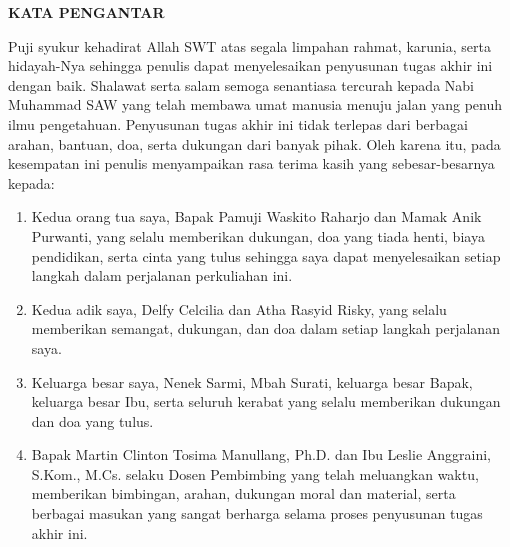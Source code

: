 \clearpage
{}%

\begin{justifying}
	\large \bfseries \centering \MakeUppercase{Kata Pengantar}\linebreak
	
	\normalsize \normalfont \justifying
	Puji syukur kehadirat Allah SWT atas segala limpahan rahmat, karunia, serta hidayah-Nya sehingga penulis dapat menyelesaikan penyusunan tugas akhir ini dengan baik. Shalawat serta salam semoga senantiasa tercurah kepada Nabi Muhammad SAW yang telah membawa umat manusia menuju jalan yang penuh ilmu pengetahuan. Penyusunan tugas akhir ini tidak terlepas dari berbagai arahan, bantuan, doa, serta dukungan dari banyak pihak. Oleh karena itu, pada kesempatan ini penulis menyampaikan rasa terima kasih yang sebesar-besarnya kepada: \par
	\begin{enumerate}
		\item Kedua orang tua saya, Bapak Pamuji Waskito Raharjo dan Mamak Anik Purwanti, yang selalu memberikan dukungan, doa yang tiada henti, biaya pendidikan, serta cinta yang tulus sehingga saya dapat menyelesaikan setiap langkah dalam perjalanan perkuliahan ini.
		\item Kedua adik saya, Delfy Celcilia dan Atha Rasyid Risky, yang selalu memberikan semangat, dukungan, dan doa dalam setiap langkah perjalanan saya.
		\item Keluarga besar saya, Nenek Sarmi, Mbah Surati, keluarga besar Bapak, keluarga besar Ibu, serta seluruh kerabat yang selalu memberikan dukungan dan doa yang tulus.
		\item Bapak Martin Clinton Tosima Manullang, Ph.D. dan Ibu Leslie Anggraini, S.Kom., M.Cs. selaku Dosen Pembimbing yang telah meluangkan waktu, memberikan bimbingan, arahan, dukungan moral dan material, serta berbagai masukan yang sangat berharga selama proses penyusunan tugas akhir ini.

\end{enumerate}
\end{justifying}
